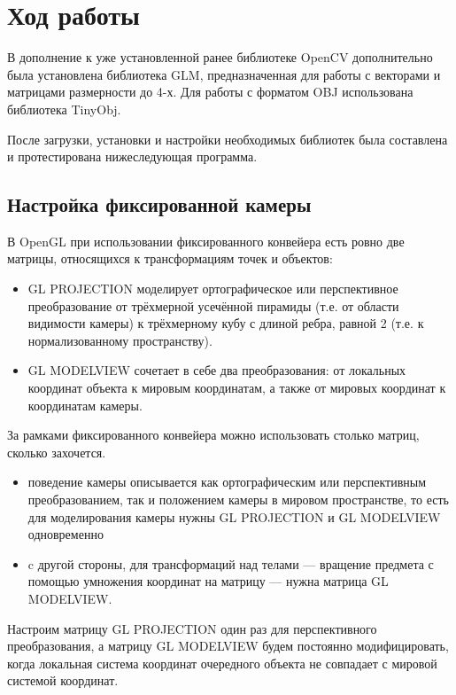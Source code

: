 \documentclass[14pt,a4paper,report]{report}
\begin{document}
\clearpage

\section{Ход работы}
В дополнение к уже установленной ранее библиотеке OpenCV дополнительно была установлена библиотека GLM, предназначенная для работы с векторами и матрицами размерности до 4-х. Для работы с форматом OBJ использована библиотека TinyObj.

После загрузки, установки и настройки необходимых библиотек была составлена и протестирована нижеследующая программа.

\subsection{Настройка фиксированной камеры}
В OpenGL при использовании фиксированного конвейера есть ровно две матрицы, относящихся к трансформациям точек и объектов:
\begin{itemize}

\item GL PROJECTION моделирует ортографическое или перспективное преобразование от трёхмерной усечённой пирамиды (т.е. от области видимости камеры) к трёхмерному кубу с длиной ребра, равной 2 (т.е. к нормализованному пространству).
\item GL MODELVIEW сочетает в себе два преобразования: от локальных координат объекта к мировым координатам, а также от мировых координат к координатам камеры.
\end{itemize}

За рамками фиксированного конвейера можно использовать столько матриц, сколько захочется. 

\begin{itemize}
\item поведение камеры описывается как ортографическим или перспективным преобразованием, так и положением камеры в мировом пространстве, то есть для моделирования камеры нужны GL PROJECTION и GL MODELVIEW одновременно
\item c другой стороны, для трансформаций над телами —  вращение предмета с помощью умножения координат на матрицу — нужна матрица GL MODELVIEW.
\end{itemize}

Настроим матрицу GL PROJECTION один раз для перспективного преобразования, а матрицу GL MODELVIEW будем постоянно модифицировать, когда локальная система координат очередного объекта не совпадает с мировой системой координат.
\end{document}
